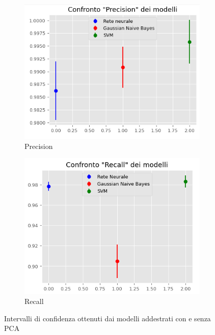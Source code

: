 \begin{figure}[!ht]
    \begin{subfigure}[b]{0.4\textwidth}
        \centering
        \includegraphics[width=\textwidth]{img/ris/precision_inter_pca.png}
        \caption{Precision}
        \label{fig:precision_pca}
    \end{subfigure}
    \hfill
    \begin{subfigure}[b]{0.4\textwidth}
        \centering
        \includegraphics[width=\textwidth]{img/ris/recall_inter_pca.png}
        \caption{Recall}
        \label{fig:recall_pca}
    \end{subfigure}
    \caption{Intervalli di confidenza ottenuti dai modelli addestrati con e senza PCA}
    \label{fig:intervalli_confidenza_pca}
\end{figure}